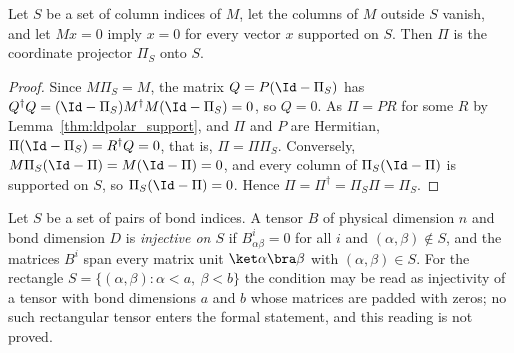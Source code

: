 \begin{lemma}
    \label{thm:ldpolar_support_diagonal}
    \leanok
    Let $S$ be a set of column indices of $M$, let the columns of $M$ outside
    $S$ vanish, and let $Mx=0$ imply $x=0$ for every vector $x$ supported on
    $S$. Then $\Pi$ is the coordinate projector $\Pi_S$ onto $S$.
\end{lemma}
\begin{proof}
    \leanok
    Since $M\Pi_S=M$, the matrix $Q=P(\Id-\Pi_S)$ has
    $Q^\dagger Q=(\Id-\Pi_S)M^\dagger M(\Id-\Pi_S)=0$, so $Q=0$. As
    $\Pi=PR$ for some $R$ by Lemma~\ref{thm:ldpolar_support}, and $\Pi$ and $P$ are
    Hermitian, $\Pi(\Id-\Pi_S)=R^\dagger Q=0$, that is, $\Pi=\Pi\Pi_S$.
    Conversely, $M\Pi_S(\Id-\Pi)=M(\Id-\Pi)=0$, and every column of
    $\Pi_S(\Id-\Pi)$ is supported on $S$, so $\Pi_S(\Id-\Pi)=0$. Hence
    $\Pi=\Pi^\dagger=\Pi_S\Pi=\Pi_S$.
\end{proof}

\begin{definition}
    \label{def:ldpolar_injective_on}
    \leanok
    Let $S$ be a set of pairs of bond indices. A tensor $B$ of physical
    dimension $n$ and bond dimension $D$ is \emph{injective on $S$} if
    $B^i_{\alpha\beta}=0$ for all $i$ and $(\alpha,\beta)\notin S$, and the
    matrices $B^i$ span every matrix unit $\ket\alpha\bra\beta$ with
    $(\alpha,\beta)\in S$. For the rectangle
    $S=\{(\alpha,\beta):\alpha<a,\ \beta<b\}$ the condition may be read as
    injectivity of a tensor with bond dimensions $a$ and $b$ whose matrices are
    padded with zeros; no such rectangular tensor enters the formal statement,
    and this reading is not proved.
\end{definition}

